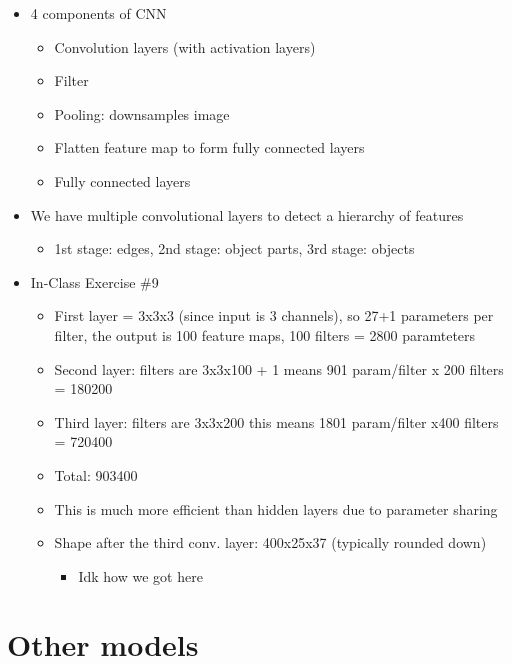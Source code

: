 \documentclass[10pt, oneside]{article}
\begin{document}
\begin{itemize}
    \item 4 components of CNN
    \begin{itemize}
        \item Convolution layers (with activation layers)
        \item Filter
        \item Pooling: downsamples image
        \item Flatten feature map to form fully connected layers
        \item Fully connected layers
    \end{itemize}
    \item We have multiple convolutional layers to detect a hierarchy of features
    \begin{itemize}
        \item 1st stage: edges, 2nd stage: object parts, 3rd stage: objects
    \end{itemize}
    \item In-Class Exercise \#9
    \begin{itemize}
        \item First layer = 3x3x3 (since input is 3 channels), so 27+1 parameters per filter, the output is 100 feature maps, 100 filters = 2800 paramteters
        \item Second layer: filters are 3x3x100 + 1 means 901 param/filter x 200 filters = 180200
        \item Third layer: filters are 3x3x200 this means 1801 param/filter x400 filters = 720400
        \item Total: 903400
        \item This is much more efficient than hidden layers due to parameter sharing
        \item Shape after the third conv. layer: 400x25x37 (typically rounded down)
        \begin{itemize}
            \item Idk how we got here
        \end{itemize}
    \end{itemize}
\end{itemize}

\section{Other models}
\end{document}
